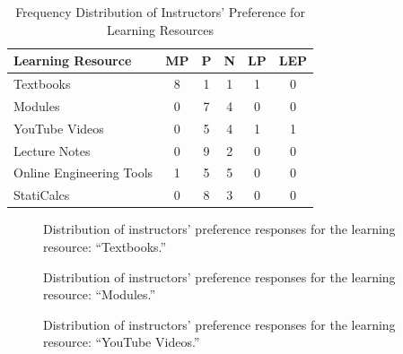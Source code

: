 \begin{table}[H]
\centering
\caption{Frequency Distribution of Instructors’ Preference for Learning Resources}
\renewcommand{\arraystretch}{1.3}
\begin{tabular}{p{6cm}ccccc}
\hline
\textbf{Learning Resource} & \textbf{MP} & \textbf{P} & \textbf{N} & \textbf{LP} & \textbf{LEP}\\
\hline
Textbooks & 8 & 1 & 1 & 1 & 0\\
Modules & 0 & 7 & 4 & 0 & 0\\
YouTube Videos & 0 & 5 & 4 & 1 & 1\\
Lecture Notes & 0 & 9 & 2 & 0 & 0\\
Online Engineering Tools & 1 & 5 & 5 & 0 & 0\\
StatiCalcs & 0 & 8 & 3 & 0 & 0\\
\hline
\end{tabular}
\end{table}


\begin{figure}[H]
\centering
{}
\caption{Distribution of instructors' preference responses for the learning resource: ``Textbooks.''}
\end{figure}


\begin{figure}[H]
\centering
{}
\caption{Distribution of instructors' preference responses for the learning resource: ``Modules.''}
\end{figure}


\begin{figure}[H]
\centering
{}
\caption{Distribution of instructors' preference responses for the learning resource: ``YouTube Videos.''}
\end{figure}


